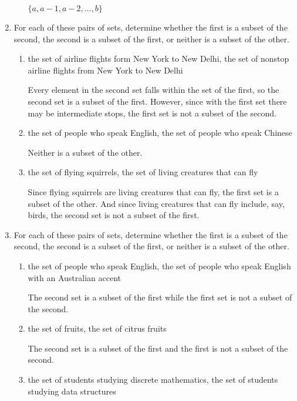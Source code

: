 \documentclass[11pt]{article}
\begin{document}
\begin{enumerate}[label=\textbf{\arabic*.}]
\begin{enumerate}[label=\textbf{\alph*)}]
		$\{a, a - 1, a - 2, \ldots, b\}$
	\end{enumerate}

	\item For each of these pairs of sets, determine whether the first is a subset of the second, the second is a subset of the first, or neither is a subset of the other.
	
	\begin{enumerate}[label=\textbf{\alph*)}]
		\item the set of airline flights form New York to New Delhi, the set of nonstop airline flights from New York to New Delhi
		
		Every element in the second set falls within the set of the first, so the second set is a subset of the first. However, since with the first set there may be intermediate stops, the first set is not a subset of the second.
		
		\item the set of people who speak English, the set of people who speak Chinese
		
		Neither is a subset of the other.
		
		\item the set of flying squirrels, the set of living creatures that can fly
		
		Since flying squirrels are living creatures that can fly, the first set is a subset of the other. And since living creatures that can fly include, say, birds, the second set is not a subset of the first.
	\end{enumerate}

	\item For each of these pairs of sets, determine whether the first is a subset of the second, the second is a subset of the first, or neither is a subset of the other.
	
	\begin{enumerate}[label=\textbf{\alph*)}]
		\item the set of people who speak English, the set of people who speak English with an Australian accent
		
		The second set is a subset of the first while the first set is not a subset of the second.
		
		\item the set of fruits, the set of citrus fruits
		
		The second set is a subset of the first and the first is not a subset of the second.
		
		\item the set of students studying discrete mathematics, the set of students studying data structures
		

\end{enumerate}
\end{enumerate}
\end{document}
